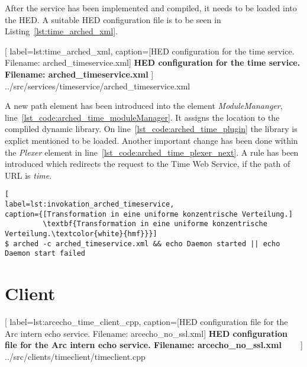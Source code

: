 After the service has been implemented and compiled, it needs to be loaded into the HED. A suitable HED configuration file is to be seen in Listing~\ref{lst:time_arched_xml}. 
\begin{program}

	[
	label=lst:time_arched_xml,
	caption={[HED configuration for the time service. Filename: arched\_timeservice.xml]
	\textbf{HED configuration for the time service. Filename: arched\_timeservice.xml}}
	]
{../src/services/timeservice/arched_timeservice.xml}
\end{program}
A new path element has been introduced into the element \textit{ModuleMananger}, line~\ref{lst_code:arched_time_moduleManager}. It assigns the location to the compliled dynamic library. 
On line~\ref{lst_code:arched_time_plugin} the library is explict mentioned to be loaded.
Another important change has been done within the \textit{Plexer} element in line~\ref{lst_code:arched_time_plexer_next}. A rule has been introduced which redirects the request to the Time Web Service, if the path of URL is \textit{time}.\\



\begin{program}
\begin{lstlisting}[
label=lst:invokation_arched_timeservice,
caption={[Transformation in eine uniforme konzentrische Verteilung.]
         \textbf{Transformation in eine uniforme konzentrische Verteilung.\textcolor{white}{hmf}}}]
$ arched -c arched_timeservice.xml && echo Daemon started || echo Daemon start failed
\end{lstlisting}
\end{program}



\section{Client}




	[
	label=lst:arcecho_time_client_cpp,
	caption={[HED configuration file for the Arc intern echo service. Filename: arcecho\_no\_ssl.xml]
	\textbf{HED configuration file for the Arc intern echo service. Filename: arcecho\_no\_ssl.xml\textcolor{white}{hmf}}}
	]
{../src/clients/timeclient/timeclient.cpp}







